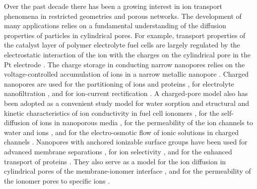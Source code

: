 \documentclass[3p,english,preprint]{elsarticle}
\begin{document}
Over the past decade there has been  a growing interest in  ion 
transport phenomena in restricted geometries 
and porous networks. The development of many applications   relies
 on a fundamental understanding of the diffusion properties
 of particles in cylindrical pores.  
For example, transport properties of the catalyst layer of polymer electrolyte fuel cells 
 are largely regulated by the electrostatic interaction of the ion with the charges  on the
cylindrical pore in the Pt electrode 
\cite{eikerling-2016-pt-water-ionomer,eikerling-2014-pt-nanochannels,eikerling-2011-pre-in-ionomer-catalyst-layer}.
The charge storage in conducting narrow nanopores  relies on the voltage-controlled 
 accumulation of ions in a narrow metallic nanopore
\cite{kornyshev-2014-charge-storage-single-file-pore,kornyshev-2014-charge-storage,zhang-2012-nanoporous-metals}. 
Charged nanopores are used for the  partitioning of ions and proteins 
\cite{rohani-2010-protein-ultrafiltration-in-charged-pore,armstrong-2013-ion selection-with-different-charges-and-mobilities-pores-grafted-charged-sidechains,stroeve-2014-protein-transport-nanopore}, 
for electrolyte nanofiltration \cite{ryzhkov-2016-nanopore}, 
 and for ion-current rectification 
\cite{oeffelen-2015-ion-current-nanopore}. 
 A  charged-pore model also has been adopted as a 
convenient study model for   
 water sorption \cite{eikerling-2011-pore-swelling-in-ionomer} and  
structural and kinetic characteristics of ion conductivity
in fuel cell ionomers   
\cite{eikerling-kornyshev-2001,paddison-2003-review,paul-paddison-2005-pore}, 
for the self-diffusion of ions in nanoporous media
\cite{jardat-2012-ion-diffusion,malgaretti-2016-charged-ion-nanopore}, 
for the permeability of the ion channels to water and ions \cite{dzubella-2005}, 
and 
for the electro-osmotic flow of ionic solutions in charged channels \cite{kim-2006}.
Nanopores with anchored ionizable surface groups have been used for  
 advanced membrane separations
\cite{szymzyk-2010charged-nanopore-ion-rejection}, 
for ion selectivity  
\cite{gassara-2015-nanofiltration-ion-grafted-charged-polymer},
  and for the enhanced transport of proteins
\cite{basconi-2015-polymer-graft-protein-transport,basconi-2014-polymer-graft-protein-transport}.
They also serve as a model for 
the ion diffusion in  cylindrical pores of the  membrane-ionomer interface
\cite{paddison-2013}, and
for the permeability of the ionomer pores to specific ions 
\cite{yang-pintauro-2004,pintauro-1995}. 
\end{document}
